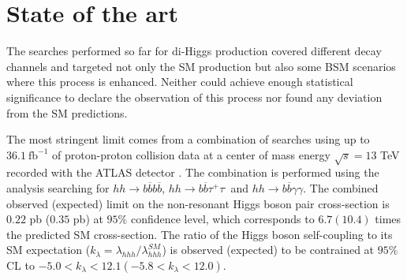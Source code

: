 
\section{State of the art}
\label{sec:backg}


The searches performed so far for di-Higgs production covered different decay channels and targeted not only the SM production but also some BSM scenarios where this process is enhanced. Neither could achieve enough statistical significance to declare the observation of this process nor found any deviation from the SM predictions. 

The most stringent limit comes from a combination of searches using up to $36.1~\text{fb}^{-1}$ of proton-proton collision data at a center of mass energy $\sqrt{s}=13$ TeV recorded with the ATLAS detector \cite{ATLAShhComb}. The combination is performed using the analysis searching for $hh\rightarrow b\overline{b}b\overline{b}$, $hh\rightarrow b\overline{b}\tau^+\tau^.$ and $hh\rightarrow b\overline{b}\gamma\gamma$. The combined observed (expected) limit on the non-resonant Higgs boson pair cross-section is $0.22$ pb ($0.35$ pb) at $95\%$ confidence level, which corresponds to $6.7 (10.4)$ times the predicted SM cross-section. The ratio of the Higgs boson self-coupling to its SM expectation ($k_{\lambda}=\lambda_{hhh}/\lambda_{hhh}^{SM}$) is observed (expected) to be contrained at $95\%$ CL to $-5.0<k_{\lambda}<12.1 (-5.8<k_{\lambda}<12.0)$. 

